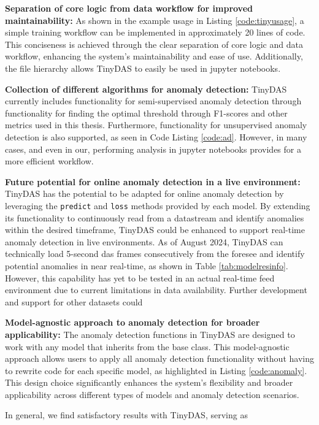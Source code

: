 \textbf{Separation of core logic from data workflow for improved maintainability:}
As shown in the example usage in Listing \ref{code:tinyusage}, a simple training workflow can be implemented in approximately 20 lines of code. This conciseness is achieved through the clear separation of core logic and data workflow, enhancing the system's maintainability and ease of use. Additionally, the file hierarchy allows TinyDAS to easily be used in jupyter notebooks. 

\textbf{Collection of different algorithms for anomaly detection:}
TinyDAS currently includes functionality for semi-supervised anomaly detection through functionality for finding the optimal threshold through F1-scores and other metrics used in this thesis. Furthermore, functionality for unsupervised anomaly detection is also supported, as seen in Code Listing \ref{code:ad}. However, in many cases, and even in our, performing analysis in jupyter notebooks provides for a more efficient workflow.

\textbf{Future potential for online anomaly detection in a live environment:}
TinyDAS has the potential to be adapted for online anomaly detection by leveraging the \lstinline|predict| and \lstinline|loss| methods provided by each model. By extending its functionality to continuously read from a datastream and identify anomalies within the desired timeframe, TinyDAS could be enhanced to support real-time anomaly detection in live environments. As of August 2024, TinyDAS can technically load 5-second \acrshort{das} frames consecutively from the \acrshort{foresee} and identify potential anomalies in near real-time, as shown in Table \ref{tab:modelresinfo}. However, this capability has yet to be tested in an actual real-time feed environment due to current limitations in data availability. Further development and support for other datasets could 

\textbf{Model-agnostic approach to anomaly detection for broader applicability:}
The anomaly detection functions in TinyDAS are designed to work with any model that inherits from the base class. This model-agnostic approach allows users to apply all anomaly detection functionality without having to rewrite code for each specific model, as highlighted in Listing \ref{code:anomaly}. This design choice significantly enhances the system's flexibility and broader applicability across different types of models and anomaly detection scenarios.

In general, we find satisfactory results with TinyDAS, serving as 


